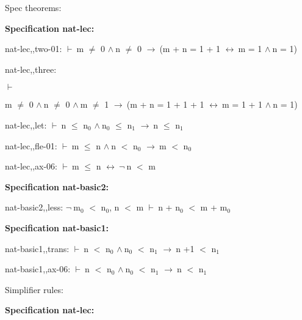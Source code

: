 \documentclass[a4paper]{article}
\newcommand{\Fol}{\mbox{$\vdash\ $}}
\newcommand{\Not}{\mbox{$\neg\ $}}
\newcommand{\And}{\mbox{$\wedge\ $}}
\newcommand{\Imp}{\mbox{$\rightarrow\ $}}
\newcommand{\Equiv}{\mbox{$\leftrightarrow\ $}}
\begin{document}
\raggedright
              
Spec theorems: 


{\bf Specification nat-lec:}

nat-lec,,two-01: 
 \Fol m $\neq$ 0 \And n $\neq$ 0 \Imp (m + n = 1 + 1 \Equiv m = 1 \And n = 1)



\bigskip

nat-lec,,three: 
\begin{flushleft}


\Fol

m $\neq$ 0 \And n $\neq$ 0 \And m $\neq$ 1 \Imp (m + n = 1 + 1 + 1 \Equiv m = 1 + 1 \And n = 1)

\end{flushleft}



\bigskip

nat-lec,,let: 
 \Fol n $\le$ $\mbox{n}_{0}$ \And $\mbox{n}_{0}$ $\le$ $\mbox{n}_{1}$ \Imp n $\le$ $\mbox{n}_{1}$



\bigskip

nat-lec,,fle-01: 
 \Fol m $\le$ n \And n $<$ $\mbox{n}_{0}$ \Imp m $<$ $\mbox{n}_{0}$



\bigskip

nat-lec,,ax-06: 
 \Fol m $\le$ n \Equiv \Not n $<$ m



\bigskip

{\bf Specification nat-basic2:}

nat-basic2,,less: 
\Not $\mbox{m}_{0}$ $<$ $\mbox{n}_{0}$, 
n $<$ m
 \Fol n + $\mbox{n}_{0}$ $<$ m + $\mbox{m}_{0}$



\bigskip

{\bf Specification nat-basic1:}

nat-basic1,,trans: 
 \Fol n $<$ $\mbox{n}_{0}$ \And $\mbox{n}_{0}$ $<$ $\mbox{n}_{1}$ \Imp n +1 $<$ $\mbox{n}_{1}$



\bigskip

nat-basic1,,ax-06: 
 \Fol n $<$ $\mbox{n}_{0}$ \And $\mbox{n}_{0}$ $<$ $\mbox{n}_{1}$ \Imp n $<$ $\mbox{n}_{1}$



\bigskip




Simplifier rules: 


{\bf Specification nat-lec:}
\end{document}
